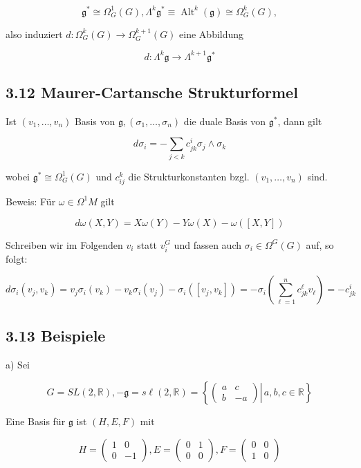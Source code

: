 \documentclass[10pt, letterpaper]{article}
\begin{document}
$$
\mathfrak{g}^{*} \cong \Omega_{G}^{1}(G), \Lambda^{k} \mathfrak{g}^{*} \equiv \operatorname{Alt}^{k}(\mathfrak{g}) \cong \Omega_{G}^{k}(G),
$$

also induziert $d: \Omega_{G}^{k}(G) \rightarrow \Omega_{G}^{k+1}(G)$ eine Abbildung

$$
d: \Lambda^{k} \mathfrak{g} \rightarrow \Lambda^{k+1} \mathfrak{g}^{*}
$$

\subsection*{3.12 Maurer-Cartansche Strukturformel}
Ist $\left(v_{1}, \ldots, v_{n}\right)$ Basis von $\mathfrak{g},\left(\sigma_{1}, \ldots, \sigma_{n}\right)$ die duale Basis von $\mathfrak{g}^{*}$, dann gilt

$$
d \sigma_{i}=-\sum_{j<k} c_{j k}^{i} \sigma_{j} \wedge \sigma_{k}
$$

wobei $\mathfrak{g}^{*} \cong \Omega_{G}^{1}(G)$ und $c_{i j}^{k}$ die Strukturkonstanten bzgl. $\left(v_{1}, \ldots, v_{n}\right)$ sind.

Beweis: Für $\omega \in \Omega^{1} M$ gilt

$$
d \omega(X, Y)=X \omega(Y)-Y \omega(X)-\omega([X, Y])
$$

Schreiben wir im Folgenden $v_{i}$ statt $v_{i}^{G}$ und fassen auch $\sigma_{i} \in \Omega^{G}(G)$ auf, so folgt:

$$
d \sigma_{i}\left(v_{j}, v_{k}\right)=v_{j} \sigma_{i}\left(v_{k}\right)-v_{k} \sigma_{i}\left(v_{j}\right)-\sigma_{i}\left(\left[v_{j}, v_{k}\right]\right)=-\sigma_{i}\left(\sum_{\ell=1}^{n} c_{j k}^{\ell} v_{\ell}\right)=-c_{j k}^{i}
$$

\subsection*{3.13 Beispiele}
a) Sei

$$
G=S L(2, \mathbb{R}),-\mathfrak{g}=s \ell(2, \mathbb{R})=\left\{\left.\left(\begin{array}{cc}
a & c \\
b & -a
\end{array}\right) \right\rvert\, a, b, c \in \mathbb{R}\right\}
$$

Eine Basis für $\mathfrak{g}$ ist $(H, E, F)$ mit

$$
H=\left(\begin{array}{cc}
1 & 0 \\
0 & -1
\end{array}\right), E=\left(\begin{array}{ll}
0 & 1 \\
0 & 0
\end{array}\right), F=\left(\begin{array}{ll}
0 & 0 \\
1 & 0
\end{array}\right)
$$
\end{document}
